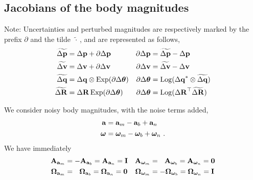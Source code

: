 %



\subsection{Jacobians of the body magnitudes}

Note: Uncertainties and perturbed magnitudes are respectively marked by the prefix $\partial$ and the tilde\, $\widetilde\cdot$\,, and are represented as follows,
%
\begin{align*}
\widetilde\Dp &= \Dp + \partial\Dp & \partial\Dp &= \widetilde\Dp-\Dp \\
\widetilde\Dv &= \Dv + \partial\Dv & \partial\Dv &= \widetilde\Dv-\Dv \\
\widetilde\Dq &= \Dq \ot \Exp( \partial\Dth ) & \partial\Dth &= \Log(\Dq^*\ot\widetilde\Dq) \\
\widetilde\DR &= \DR  \Exp( \partial\Dth ) & \partial\Dth &= \Log(\DR\tr\widetilde\DR) 
\end{align*}




We consider noisy body magnitudes, with the noise terms added,%
%
\begin{align*}
\bfa &= \bfa_m - \ab + \bfa_n \\
\bw &= \bw_m - \wb + \bw_n 
~.
\end{align*}
%
We have immediately
%
\begin{align*}
\bfA_{\bfa_m} 
  &= -\bfA_{\bfa_b} = \bfA_{\bfa_n} = \bfI 
& \bfA_{\bw_m} 
  &= ~~\bfA_{\bw_b} = \bfA_{\bw_n} = \bf0 \\
\bfOmega_{\bfa_m} 
  &= ~~\bfOmega_{\bfa_b} = \bfOmega_{\bfa_n} = \bf0 
& \bfOmega_{\bw_m} 
  &= -\bfOmega_{\bw_b} = \bfOmega_{\bw_n} = \bfI 
\end{align*}


